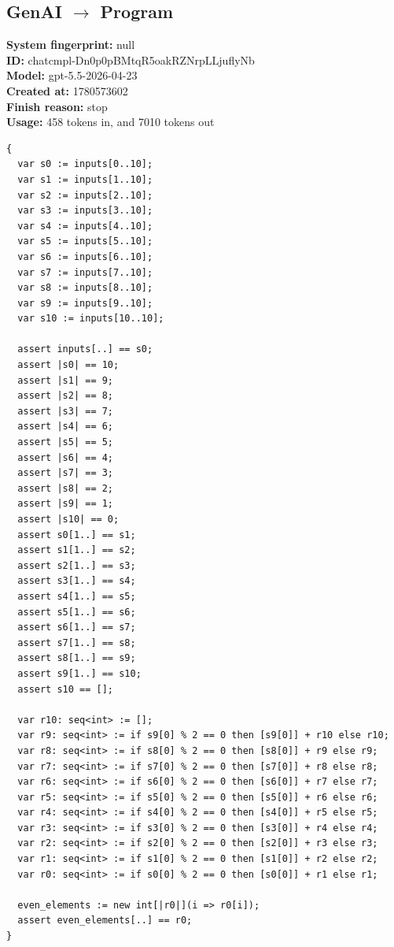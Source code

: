 \documentclass{article}
\begin{document}
\subsection*{GenAI $\rightarrow$ Program}
\textbf{System fingerprint: }null
\\\textbf{ID: }chatcmpl-Dn0p0pBMtqR5oakRZNrpLLjuflyNb
\\\textbf{Model: }gpt-5.5-2026-04-23
\\\textbf{Created at: }1780573602
\\\textbf{Finish reason: }stop
\\\textbf{Usage: }458 tokens in, and 7010 tokens out
\begin{lstlisting}
{
  var s0 := inputs[0..10];
  var s1 := inputs[1..10];
  var s2 := inputs[2..10];
  var s3 := inputs[3..10];
  var s4 := inputs[4..10];
  var s5 := inputs[5..10];
  var s6 := inputs[6..10];
  var s7 := inputs[7..10];
  var s8 := inputs[8..10];
  var s9 := inputs[9..10];
  var s10 := inputs[10..10];

  assert inputs[..] == s0;
  assert |s0| == 10;
  assert |s1| == 9;
  assert |s2| == 8;
  assert |s3| == 7;
  assert |s4| == 6;
  assert |s5| == 5;
  assert |s6| == 4;
  assert |s7| == 3;
  assert |s8| == 2;
  assert |s9| == 1;
  assert |s10| == 0;
  assert s0[1..] == s1;
  assert s1[1..] == s2;
  assert s2[1..] == s3;
  assert s3[1..] == s4;
  assert s4[1..] == s5;
  assert s5[1..] == s6;
  assert s6[1..] == s7;
  assert s7[1..] == s8;
  assert s8[1..] == s9;
  assert s9[1..] == s10;
  assert s10 == [];

  var r10: seq<int> := [];
  var r9: seq<int> := if s9[0] % 2 == 0 then [s9[0]] + r10 else r10;
  var r8: seq<int> := if s8[0] % 2 == 0 then [s8[0]] + r9 else r9;
  var r7: seq<int> := if s7[0] % 2 == 0 then [s7[0]] + r8 else r8;
  var r6: seq<int> := if s6[0] % 2 == 0 then [s6[0]] + r7 else r7;
  var r5: seq<int> := if s5[0] % 2 == 0 then [s5[0]] + r6 else r6;
  var r4: seq<int> := if s4[0] % 2 == 0 then [s4[0]] + r5 else r5;
  var r3: seq<int> := if s3[0] % 2 == 0 then [s3[0]] + r4 else r4;
  var r2: seq<int> := if s2[0] % 2 == 0 then [s2[0]] + r3 else r3;
  var r1: seq<int> := if s1[0] % 2 == 0 then [s1[0]] + r2 else r2;
  var r0: seq<int> := if s0[0] % 2 == 0 then [s0[0]] + r1 else r1;

  even_elements := new int[|r0|](i => r0[i]);
  assert even_elements[..] == r0;
}
\end{lstlisting}
\end{document}
